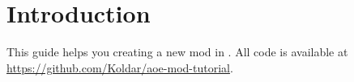\chapter{Introduction}

This guide helps you creating a new mod in \aoe{}.
All code is available at \url{https://github.com/Koldar/aoe-mod-tutorial}.

